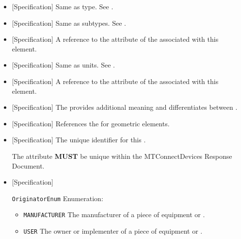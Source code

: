 \begin{itemize}

\item {}[Specification] \newline Same as  type. See .

\item {}[Specification] \newline Same as  subtypes. See .

\item {}[Specification] \newline A reference to the  attribute of the  associated with this element.

\item {}[Specification] \newline Same as  units. See .

\item {}[Specification] \newline A reference to the  attribute of the  associated with this element.

\item {}[Specification] \newline The  provides additional meaning and differentiates between .

\item {}[Specification] \newline References the  for geometric  elements.

\item {}[Specification] \newline The unique identifier for this .

The  attribute \textbf{MUST} be unique within the \gls{MTConnectDevices Response Document}.

\item {}[Specification] \newline 

\texttt{OriginatorEnum} Enumeration:

\begin{itemize}
\item \texttt{MANUFACTURER} \newline The manufacturer of a piece of equipment or . 
\item \texttt{USER} \newline The owner or implementer of a piece of equipment or . 
\end{itemize}

\end{itemize}

